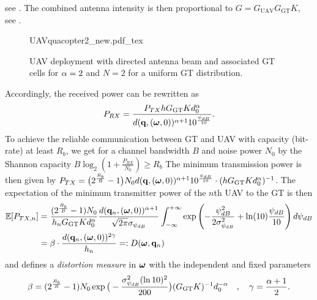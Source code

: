 \documentclass[smallabstract,smallcaptions]{dccpaper}
\newcommand{\Rb}{\ensuremath{R_b}}         %
\newcommand{\GGT}{\ensuremath{G_{\text{GT}}}}         %
\newcommand{\GUAV}{\ensuremath{G_{\text{UAV}}}}         %
\newcommand{\Dis}{\ensuremath{D}}                    %
\begin{document}
%
see \cite[pp.52]{Bal05}. The combined antenna intensity is then proportional to
%
$G=\GUAV \GGT K$, see .
%
\begin{figure}
  \centering
  \def\svgwidth{.9\textwidth} \scriptsize{
    {UAVquacopter2_new.pdf_tex}}
    \caption{UAV deployment with directed antenna beam and associated GT cells for $\alpha=2$ and $N=2$ for a uniform GT distribution.}
    \label{fig:uavdirected}
\end{figure}
%
Accordingly, the received power can be rewritten as
%
\begin{equation}
  P_{RX}=\frac{P_{TX}h \GGT K d^{\alpha}_0}{d(\vq,(\vome,0))^{\alpha+1}10^{\frac{\psi_{dB}}{10}}}.
\end{equation}
%
To achieve the reliable communication between GT and UAV with capacity (bit-rate) at least $\Rb$, we get for a
channel bandwidth $B$  and noise power $N_0$ by the Shannon capacity 
$B\log_2\left(1+\frac{P_{RX}}{N_0}\right)\ge\Rb$
The minimum transmission power is then given by
$P_{TX}=\big(2^{\frac{\Rb}{B}}-1\big)N_0d(\vq,(\vome,0))^{\alpha+1}10^{\frac{\psi_{dB}}{10}} \cdot  (h \GGT
Kd^{\alpha}_0)^{-1}$.
%
%
The expectation of the minimum transmitter power of the $n$th UAV to the GT is then 
%
\begin{align}
  \Expect{P_{TX,n}}& =
  \frac{(2^{\frac{\Rb}{B}}-1)N_0 }{ h_n \GGT Kd^{\alpha}_0}
   \frac{d(\vq_n,(\vome,0))^{\alpha+1}}{\sqrt{2\pi}\sigma_{\psi_{dB}}} \int_{-\infty}^{+\infty}
     \exp\left(-\frac{\psi^2_{dB}}{2\sigma^2_{\psi_{dB}}}+ \ln(10) \frac{\psi_{dB}}{10}\right)d\psi_{dB}\notag\\
  &=\bet \cdot  \frac{d( \vq_n,(\vome,0))^{2\gam}}{h_n}=:\Dis(\vome,\vq_n) \label{eq:Eptx}
\end{align}
%
and defines a \emph{distortion measure} in $\boldsymbol{ \omega}$ with the independent and fixed parameters
%
\begin{align}
  \bet=(2^{\frac{\Rb}{B}}-1) N_0 \exp\big(-\frac{\sig_{\psi_{dB}}^2 (\ln 10)^2}{200}\big)(\GGT K)^{-1} d_0^{-\alp}\quad,\quad
  \gam=\frac{\alp+1}{2}.
\end{align}
%
\end{document}
